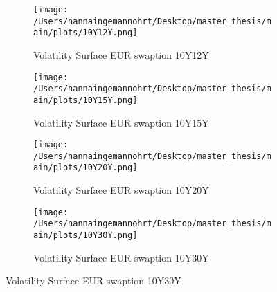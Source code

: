 \begin{figure}[H]
    \begin{subfigure}{0.43\textwidth}
        \texttt{[image: /Users/nannaingemannohrt/Desktop/master\_thesis/main/plots/10Y12Y.png]}
        \caption{Volatility Surface EUR swaption 10Y12Y}
        \label{fig:10Y12Y_}
    \end{subfigure}\hfill
    \begin{subfigure}{0.43\textwidth}
        \texttt{[image: /Users/nannaingemannohrt/Desktop/master\_thesis/main/plots/10Y15Y.png]}
        \caption{Volatility Surface EUR swaption 10Y15Y}
        \label{fig:10Y15Y_}
    \end{subfigure}
    \begin{subfigure}{0.43\textwidth}
        \texttt{[image: /Users/nannaingemannohrt/Desktop/master\_thesis/main/plots/10Y20Y.png]}
        \caption{Volatility Surface EUR swaption 10Y20Y}
        \label{fig:10Y20Y_}
    \end{subfigure}\hfill
    \begin{subfigure}{0.43\textwidth}
        \texttt{[image: /Users/nannaingemannohrt/Desktop/master\_thesis/main/plots/10Y30Y.png]}
        \caption{Volatility Surface EUR swaption 10Y30Y}
        \label{fig:10Y30Y_}
    \end{subfigure}
\end{figure}   
